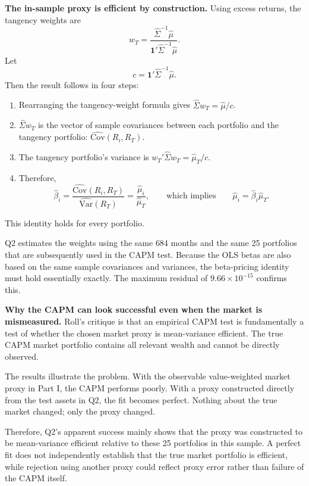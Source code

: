 \textbf{The in-sample proxy is efficient by construction.} Using excess
returns, the tangency weights are
\[
w_T = \frac{\hat\Sigma^{-1}\hat\mu}{\mathbf{1}'\hat\Sigma^{-1}\hat\mu}.
\]
Let
\[
c = \mathbf{1}'\hat\Sigma^{-1}\hat\mu.
\]
Then the result follows in four steps:
\begin{enumerate}\setlength{\itemsep}{2pt}\setlength{\topsep}{3pt}
\item Rearranging the tangency-weight formula gives
$\hat\Sigma w_T = \hat\mu / c$.
\item $\hat\Sigma w_T$ is the vector of sample covariances between each
portfolio and the tangency portfolio:
$\widehat{\mathrm{Cov}}(R_i, R_T)$.
\item The tangency portfolio's variance is
$w_T'\hat\Sigma w_T = \hat\mu_T / c$.
\item Therefore,
\[
\hat\beta_i = \frac{\widehat{\mathrm{Cov}}(R_i, R_T)}
{\widehat{\mathrm{Var}}(R_T)} = \frac{\hat\mu_i}{\hat\mu_T},
\qquad\text{which implies}\qquad
\hat\mu_i = \hat\beta_i \hat\mu_T .
\]
\end{enumerate}
This identity holds for every portfolio.

Q2 estimates the weights using the same 684 months and the same 25 portfolios
that are subsequently used in the CAPM test. Because the OLS betas are also
based on the same sample covariances and variances, the beta-pricing identity
must hold essentially exactly. The maximum residual of $9.66\times10^{-15}$
confirms this.

\textbf{Why the CAPM can look successful even when the market is mismeasured.}
Roll's critique is that an empirical CAPM test is fundamentally a test of
whether the chosen market proxy is mean-variance efficient. The true CAPM
market portfolio contains all relevant wealth and cannot be directly observed.

The results illustrate the problem. With the observable value-weighted market
proxy in Part I, the CAPM performs poorly. With a proxy constructed directly
from the test assets in Q2, the fit becomes perfect. Nothing about the true
market changed; only the proxy changed.

Therefore, Q2's apparent success mainly shows that the proxy was constructed to
be mean-variance efficient relative to these 25 portfolios in this sample. A
perfect fit does not independently establish that the true market portfolio is
efficient, while rejection using another proxy could reflect proxy error rather
than failure of the CAPM itself.

